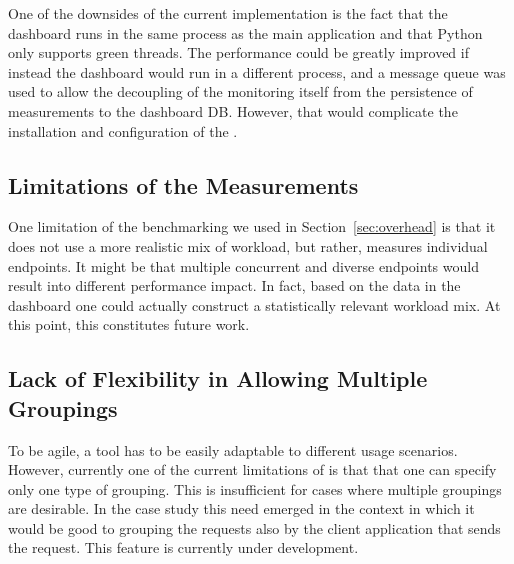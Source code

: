     One of the downsides of the current implementation is the fact that the dashboard runs in the same process as the main application and that Python only supports green threads. The performance could be greatly improved if instead the dashboard would run in a different process, %
    and a message queue was used to allow the decoupling of the monitoring itself from the persistence of measurements to the dashboard DB. 
    However, that would complicate the installation and configuration of the \tool.


  \subsection*{Limitations of the Measurements}
    One limitation of the benchmarking we used in Section~\ref{sec:overhead} is that it does not use a more realistic mix of workload, but rather, measures individual endpoints. It might be that multiple concurrent and diverse endpoints would result into different performance impact. In fact, based on the data in the dashboard one could actually construct a statistically relevant workload mix. At this point, this constitutes future work.







  \subsection*{Lack of Flexibility in Allowing Multiple Groupings}

    To be agile, a tool has to be easily adaptable to different usage scenarios. However, currently one of the current limitations of \tool is that that one can specify only one type of grouping. This is insufficient for cases where multiple groupings are desirable. In the \zee case study this need emerged in the context in which it would be good to grouping the requests also by the client application that sends the request. This feature is currently under development.

